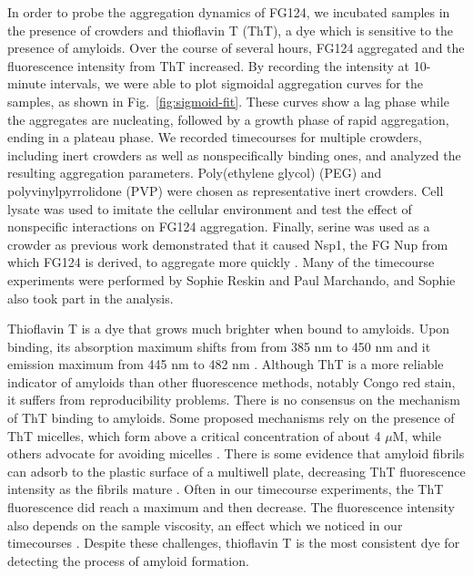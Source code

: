 In order to probe the aggregation dynamics of FG124, we incubated samples in the presence of crowders and thioflavin T (ThT), a dye which is sensitive to the presence of amyloids.  Over the course of several hours, FG124 aggregated and the fluorescence intensity from ThT increased.  By recording the intensity at 10-minute intervals, we were able to plot sigmoidal aggregation curves for the samples, as shown in Fig.~\ref{fig:sigmoid-fit}.  These curves show a lag phase while the aggregates are nucleating, followed by a growth phase of rapid aggregation, ending in a plateau phase.  We recorded timecourses for multiple crowders, including inert crowders as well as nonspecifically binding ones, and analyzed the resulting aggregation parameters.  Poly(ethylene glycol) (PEG) and polyvinylpyrrolidone (PVP) were chosen as representative inert crowders.  Cell lysate was used to imitate the cellular environment and test the effect of nonspecific interactions on FG124 aggregation.  Finally, serine was used as a crowder as previous work demonstrated that it caused Nsp1, the FG Nup from which FG124 is derived, to aggregate more quickly \cite{frey07}.  Many of the timecourse experiments were performed by Sophie Reskin and Paul Marchando, and Sophie also took part in the analysis.

Thioflavin T is a dye that grows much brighter when bound to amyloids.  Upon binding, its absorption maximum shifts from from 385 nm to 450 nm and it emission maximum from 445 nm to 482 nm \cite{picken12}.  Although ThT is a more reliable indicator of amyloids than other fluorescence methods, notably Congo red stain, it suffers from reproducibility problems.  There is no consensus on the mechanism of ThT binding to amyloids.  Some proposed mechanisms rely on the presence of ThT micelles, which form above a critical concentration of about 4 $\mu$M, while others advocate for avoiding micelles \cite{khurana05, groenning09}.  There is some evidence that amyloid fibrils can adsorb to the plastic surface of a multiwell plate, decreasing ThT fluorescence intensity as the fibrils mature \cite{murray13}.  Often in our timecourse experiments, the ThT fluorescence did reach a maximum and then decrease.  The fluorescence intensity also depends on the sample viscosity, an effect which we noticed in our timecourses \cite{sulatskaya10}.  Despite these challenges, thioflavin T is the most consistent dye for detecting the process of amyloid formation.

